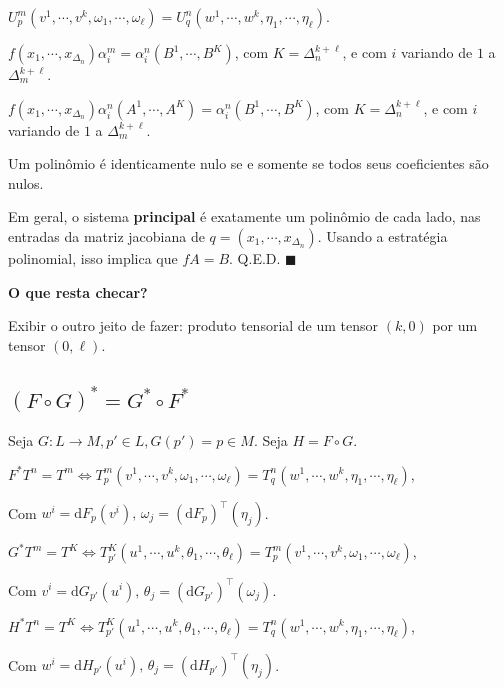 \documentclass[12pt]{article}
\begin{document}
		$U_p^m(v^1, \cdots, v^k, \omega_1, \cdots, \omega_\ell) = U_q^n(w^1, \cdots, w^k, \eta_1, \cdots, \eta_\ell)$.

		$f(x_1, \cdots, x_{\Delta_n}) \alpha_i^m = \alpha_i^n (B^1, \cdots, B^K)$, com $K = \Delta_n^{k + \ell}$, e com $i$ variando de $1$ a $\Delta_m^{k + \ell}$.

		$f(x_1, \cdots, x_{\Delta_n}) \alpha_i^n(A^1, \cdots, A^K) = \alpha_i^n (B^1, \cdots, B^K)$, com $K = \Delta_n^{k + \ell}$, e com $i$ variando de $1$ a $\Delta_m^{k + \ell}$.

		Um polin\^omio \'e identicamente nulo se e somente se todos seus coeficientes s\~ao nulos.

		Em geral, o sistema \textbf{principal} \'e exatamente um polin\^omio de cada lado, nas entradas da matriz jacobiana de $q = (x_1, \cdots, x_{\Delta_n})$. Usando a estrat\'egia polinomial, isso implica que $fA = B$. Q.E.D.$\,\,\blacksquare$

		\textbf{O que resta checar?}

		Exibir o outro jeito de fazer: produto tensorial de um tensor $(k,0)$ por um tensor $(0,\ell)$.

		\subsection{$(F \circ G)^* = G^* \circ F^*$}
		\begin{flushright}
		\end{flushright}

		Seja $G: L \rightarrow M, p' \in L, G(p') = p \in M$. Seja $H = F \circ G$.

		$F^* T^n = T^m \Leftrightarrow T_p^m(v^1, \cdots, v^k, \omega_1, \cdots, \omega_\ell) = T_q^n(w^1, \cdots, w^k, \eta_1, \cdots, \eta_\ell)$,

		Com $w^i = \mathrm{d}F_p(v^i),\,\omega_j = (\mathrm{d}F_p)^\top (\eta_j)$.

		$G^* T^m = T^K \Leftrightarrow T_{p'}^K(u^1, \cdots, u^k, \theta_1, \cdots, \theta_\ell) = T_p^m(v^1, \cdots, v^k, \omega_1, \cdots, \omega_\ell)$,

		Com $v^i = \mathrm{d}G_{p'} (u^i),\,\theta_j = (\mathrm{d}G_{p'})^\top (\omega_j)$.

		$H^* T^n = T^K \Leftrightarrow T_{p'}^K(u^1, \cdots, u^k, \theta_1, \cdots, \theta_\ell) = T_q^n(w^1, \cdots, w^k, \eta_1, \cdots, \eta_\ell)$,

		Com $w^i = \mathrm{d}H_{p'} (u^i),\,\theta_j = (\mathrm{d}H_{p'})^\top (\eta_j)$.
\end{document}
